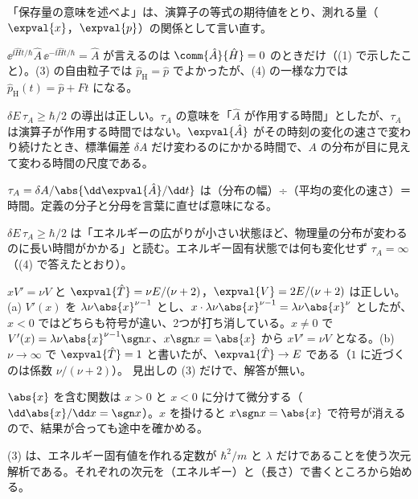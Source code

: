 \begin{rikai}
  \item 「保存量の意味を述べよ」は、演算子の等式の期待値をとり、測れる量（$\expval{x}$，$\expval{p}$）の関係として言い直す。
  \item $\ee^{\ii\hat{H}t/\hbar}\hat{A}\,\ee^{-\ii\hat{H}t/\hbar}=\hat{A}$ が言えるのは $\comm{\hat{A}}{\hat{H}}=0$ のときだけ（(1) で示したこと）。(3) の自由粒子では $\hat{p}_{\mathrm{H}}=\hat{p}$ でよかったが、(4) の一様な力では $\hat{p}_{\mathrm{H}}(t)=\hat{p}+Ft$ になる。
\end{rikai}
\begin{kotaeran}
   $\delta E\,\tau_{A}\ge\hbar/2$ の導出は正しい。$\tau_{A}$ の意味を「$\hat{A}$ が作用する時間」としたが、$\tau_{A}$ は演算子が作用する時間ではない。$\expval{\hat{A}}$ がその時刻の変化の速さで変わり続けたとき、標準偏差 $\delta A$ だけ変わるのにかかる時間で、$A$ の分布が目に見えて変わる時間の尺度である。
\end{kotaeran}
\begin{rikai}
  \item $\tau_{A}=\delta A/\abs{\dd\expval{\hat{A}}/\dd t}$ は（分布の幅）÷（平均の変化の速さ）＝時間。定義の分子と分母を言葉に直せば意味になる。
  \item $\delta E\,\tau_{A}\ge\hbar/2$ は「エネルギーの広がりが小さい状態ほど、物理量の分布が変わるのに長い時間がかかる」と読む。エネルギー固有状態では何も変化せず $\tau_{A}=\infty$（(4) で答えたとおり）。
\end{rikai}
\begin{kotaeran}
   $xV'=\nu V$ と $\expval{\hat{T}}=\nu E/(\nu+2)$，$\expval{V}=2E/(\nu+2)$ は正しい。(a) $V'(x)$ を $\lambda\nu\abs{x}^{\nu-1}$ とし、$x\cdot\lambda\nu\abs{x}^{\nu-1}=\lambda\nu\abs{x}^{\nu}$ としたが、$x<0$ ではどちらも符号が違い、2つが打ち消している。$x\neq0$ で $V'(x)=\lambda\nu\abs{x}^{\nu-1}\sgn x$、$x\sgn x=\abs{x}$ から $xV'=\nu V$ となる。(b) $\nu\to\infty$ で $\expval{\hat{T}}=1$ と書いたが、$\expval{\hat{T}}\to E$ である（$1$ に近づくのは係数 $\nu/(\nu+2)$）。
   見出しの (3) だけで、解答が無い。
\end{kotaeran}
\begin{rikai}
  \item $\abs{x}$ を含む関数は $x>0$ と $x<0$ に分けて微分する（$\dd\abs{x}/\dd x=\sgn x$）。$x$ を掛けると $x\sgn x=\abs{x}$ で符号が消えるので、結果が合っても途中を確かめる。
  \item (3) は、エネルギー固有値を作れる定数が $\hbar^{2}/m$ と $\lambda$ だけであることを使う次元解析である。それぞれの次元を（エネルギー）と（長さ）で書くところから始める。
\end{rikai}

